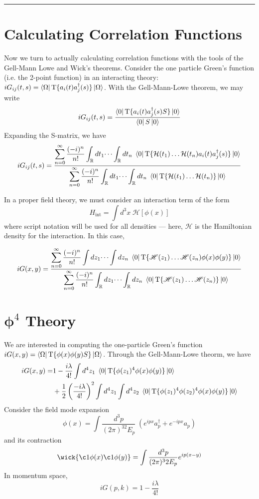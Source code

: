 \documentclass[onecolumn]{gwclass}
\def \*#1{\boldsymbol{#1}}
\renewcommand{\t}[1]{\text{#1}}
\def \timeorder{\t{T}}
\newcommand{\R}{\mathbb{R}}
\begin{document}
\noindent\rule{\textwidth}{1pt}


\newpage

\section{Calculating Correlation Functions}
Now we turn to actually calculating correlation functions with the tools of the Gell-Mann Lowe and Wick's theorems. Consider the one particle Green's function (i.e. the 2-point function) in an interacting theory: $iG_{ij}(t,s)=\bra{\Omega} \timeorder\{ a_i(t) a_j^\dagger(s)\} \ket{\Omega}$. With the Gell-Mann-Lowe theorem, we may write
$$ iG_{ij}(t,s)  = \frac{\bra{0} \timeorder\{a_i(t)a_j^\dagger(s)S\}\ket{0}}{\bra{0}S\ket{0}} $$
Expanding the S-matrix, we have
$$ iG_{ij}(t,s) = \frac{\displaystyle\sum_{n=0}^\infty \frac{(-i)^n}{n!}\int_\R dt_1\dots \int_\R dt_n \; \bra{0}\timeorder\{\mathcal{H}(t_1)\dots\mathcal{H}(t_n)a_i(t)a_j^\dagger(s)\}\ket{0}}{\displaystyle\sum_{n=0}^\infty \frac{(-i)^n}{n!}\int_\R dt_1\dots \int_\R dt_n \; \bra{0}\timeorder\{\mathcal{H}(t_1)\dots\mathcal{H}(t_n)\}\ket{0}} $$

In a proper field theory, we must consider an interaction term of the form
$$ H_\t{int} = \int d^3x\;\mathscr{H}[\phi(x)] $$
where script notation will be used for all densities --- here, $\mathscr{H}$ is the Hamiltonian density for the interaction. In this case, 

$$ iG(x,y) = \frac{\displaystyle\sum_{n=0}^\infty \frac{(-i)^n}{n!}\int dz_1\dots \int dz_n \; \bra{0}\timeorder\{\mathscr{H}(z_1)\dots\mathscr{H}(z_n)\phi(x)\phi(y)\}\ket{0}}{\displaystyle\sum_{n=0}^\infty \frac{(-i)^n}{n!}\int_\R dz_1\dots \int_\R dz_n \; \bra{0}\timeorder\{\mathscr{H}(z_1)\dots\mathscr{H}(z_n)\}\ket{0}} $$

\section{$\*\phi^4$ Theory}

We are interested in computing the one-particle Green's function $iG(x,y) = \bra{\Omega}\timeorder\{\phi(x)\phi(y)S\}\ket{\Omega}$. Through the Gell-Mann-Lowe theorm, we have
\begin{align*} 
	iG(x,y) = &1 - \frac{i\lambda}{4!}\int d^4z_1\;\bra{0}\timeorder\{\phi(z_1)^4\phi(x)\phi(y)\}\ket{0}  \\
	&+ \frac{1}{2}\left(\frac{-i\lambda}{4!}\right)^2 \int d^4z_1 \int d^4z_2\;\bra{0}\timeorder\{\phi(z_1)^4\phi(z_2)^4\phi(x)\phi(y)\}\ket{0}
\end{align*}
Consider the field mode expansion
$$ \phi(x) = \int \frac{d^3p}{(2\pi)^32E_p}\;(e^{ip x}a_p^\dagger + e^{-ip x}a_p)	$$
and its contraction
$$ \wick{ \c1 \phi(x) \c1 \phi(y)} = \int\frac{d^3p}{(2\pi)^32E_p} e^{ip	(x-y)} $$
In momentum space,
$$ iG(p,k) = 1 - \frac{i\lambda}{4!} $$
\end{document}
